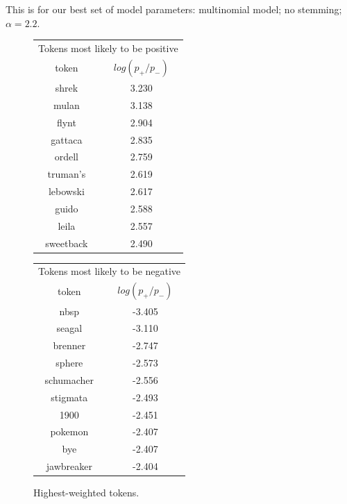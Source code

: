 \documentclass{article}
\begin{document}


This is for our best set of model parameters: multinomial model; no stemming; \(\alpha=2.2\).

\begin{figure}
\begin{tabular}{c|c}
    \multicolumn{2}{c}{Tokens most likely to be positive} \\
    token & \(log(p_+ / p_-)\) \\
    \hline
    shrek & 3.230 \\
    mulan & 3.138 \\
    flynt & 2.904 \\
    gattaca & 2.835 \\
    ordell & 2.759 \\
    truman's & 2.619 \\
    lebowski & 2.617 \\
    guido & 2.588 \\
    leila & 2.557 \\
    sweetback & 2.490
\end{tabular}
\begin{tabular}{c|c}
    \multicolumn{2}{c}{Tokens most likely to be negative} \\
    token & \(log(p_+ / p_-)\) \\
    \hline
    nbsp & -3.405 \\
    seagal & -3.110 \\
    brenner & -2.747 \\
    sphere & -2.573 \\
    schumacher & -2.556 \\
    stigmata & -2.493 \\
    1900 & -2.451 \\
    pokemon & -2.407 \\
    bye & -2.407 \\
    jawbreaker & -2.404
\end{tabular}
\caption{Highest-weighted tokens.}
\end{figure}
\end{document}
